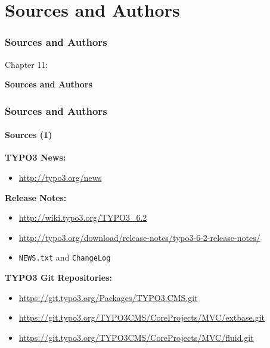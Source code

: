 %

\section{Sources and Authors}
\begin{frame}[fragile]
	\frametitle{Sources and Authors}

	\begin{center}\huge{Chapter 11:}\end{center}
	\begin{center}\huge{\color{typo3darkgrey}\textbf{Sources and Authors}}\end{center}

\end{frame}


\begin{frame}[fragile]
	\frametitle{Sources and Authors}
	\framesubtitle{Sources (1)}

	\textbf{TYPO3 News:}
		\begin{itemize}\smaller
			\item \url{http://typo3.org/news}
		\end{itemize}

	\textbf{Release Notes:}
		\begin{itemize}\smaller
			\item \url{http://wiki.typo3.org/TYPO3_6.2}
			\item \url{http://typo3.org/download/release-notes/typo3-6-2-release-notes/}
			\item \texttt{NEWS.txt} and \texttt{ChangeLog}
		\end{itemize}

	\textbf{TYPO3 Git Repositories:}
		\begin{itemize}\smaller
			\item \url{https://git.typo3.org/Packages/TYPO3.CMS.git}
			\item \url{https://git.typo3.org/TYPO3CMS/CoreProjects/MVC/extbase.git}
			\item \url{https://git.typo3.org/TYPO3CMS/CoreProjects/MVC/fluid.git}
		\end{itemize}

\end{frame}

